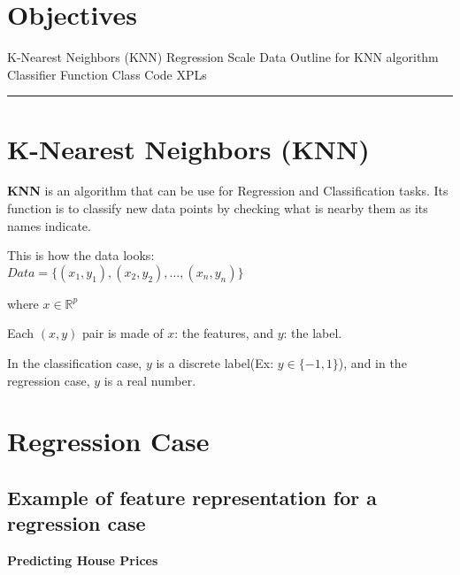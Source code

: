 \section*{Objectives}
\begin{outline}
    \1 K-Nearest Neighbors (KNN)
    \1 Regression
    \1 Scale Data
    \1 Outline for KNN algorithm
    \1 Classifier Function
    \1 Class Code
    \1 XPLs
\end{outline}

\rule[0.0051in]{\textwidth}{0.00025in}

\section{K-Nearest Neighbors (KNN)}

\textbf{KNN} is an algorithm that can be use for Regression and Classification tasks. Its function is to classify new data points
by checking what is nearby them as its names indicate.

This is how the data looks:\\
$Data = \{(x_1, y_1), (x_2, y_2), \dots, (x_n, y_n)\}$

where $x \in \mathbb{R}^p$

Each $(x,y)$ pair is made of $x$: the features, and $y$: the label.

In the classification case, $y$ is a discrete label(Ex: $y\in\{-1,1\}$), and in the regression case, $y$ is a real number.


\section{Regression Case}

\subsection{Example of feature representation for a regression case}

\begin{center}
    \textbf{Predicting House Prices}
\end{center}

